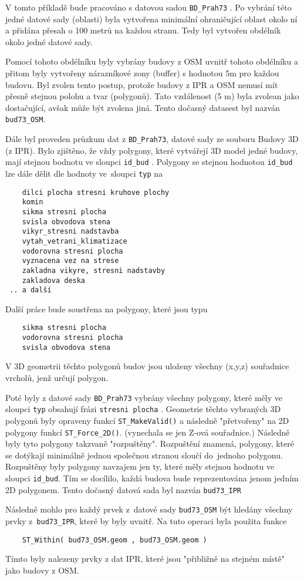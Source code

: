 V tomto příkladě bude pracováno s datovou sadou {\tt BD\_Prah73} .
Po vybrání této jedné datové sady (oblasti) byla vytvořena minimální
ohraničující oblast okolo ní a přidána přesah o 100 metrů na každou stranu.
Tedy byl vytvořen obdélník okolo jedné datové sady.

Pomocí tohoto obdélníku byly vybrány budovy z OSM uvnitř tohoto obdélníku
a přitom byly vytvořeny nárazníkové zony (buffer) s hodnotou 5m pro každou budovu.
Byl zvolen tento postup, protože budovy z IPR a OSM nemusí mít přesně stejnou
polohu a tvar (polygonů).
Tato vzdálenost (5 m) byla zvolean jako dostačující, avšak může být zvolena jiná.
Tento dočasný datasest byl nazván {\tt bud73\_OSM}.

Dále byl proveden průzkum dat z {\tt BD\_Prah73},
datové sady ze souboru Budovy 3D (z IPR).
Bylo zjištěno, že vždy polygony, které vytvářejí 3D model jedné budovy,
mají stejnou bodnotu ve sloupci {\tt id\_bud} .
Polygony se stejnou hodnotou {\tt id\_bud} lze dále dělit dle hodnoty
ve~sloupci {\tt typ} na
\begin{verbatim}
    dilci plocha stresni kruhove plochy
    komin
    sikma stresni plocha
    svisla obvodova stena
    vikyr_stresni nadstavba
    vytah_vetrani_klimatizace
    vodorovna stresni plocha
    vyznacena vez na strese
    zakladna vikyre, stresni nadstavby
    zakladova deska
 .. a další
\end{verbatim}
Další práce bude soustřena na polygony, které jsou typu
\begin{verbatim}
    sikma stresni plocha
    vodorovna stresni plocha
    svisla obvodova stena
\end{verbatim}
V 3D geometrii těchto polygonů budov jsou uloženy všechny (x,y,z) souřadnice
vrcholů, jenž určují polygon.

Poté byly z datové sady {\tt BD\_Prah73} vybrány všechny polygony, které
měly ve sloupci {\tt typ} obsahují frázi {\tt stresni plocha} .
Geometrie těchto vybraných 3D polygonů byly opraveny funkcí {\tt ST\_MakeValid()}
a následně "přetvořeny" na 2D polygony funkcí {\tt ST\_Force\_2D()}.
(vynechala se jen Z-ová souřadnice.)
Následně byly tyto polygony takzvaně "rozpuštěny". Rozpuštění znamená,
polygony, které se dotýkají minimálně jednou společnou stranou sloučí
do~jednoho polygonu.
Rozpuštěny byly polygony navzajem jen ty, které měly stejnou hodnotu ve sloupci 
{\tt id\_bud}.
Tím se docílilo, každá budova bude reprezentována jenom jedním 2D polygonem.
Tento dočasný datová sada byl nazván {\tt bud73\_IPR}

Následně mohlo pro každý prvek z~datové sady {\tt bud73\_OSM} být hledány
všechny prvky z~{\tt bud73\_IPR}, které by byly uvnitř.
Na tuto operaci byla použita funkce
\begin{verbatim}
    ST_Within( bud73_OSM.geom , bud73_OSM.geom )
\end{verbatim}
Tímto byly nalezeny prvky z dat IPR, které jsou "přibližně na stejném místě"
jako budovy z OSM.

